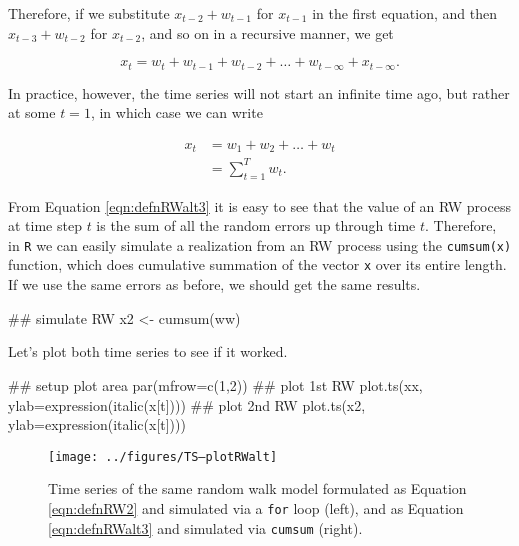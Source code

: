 \noindent Therefore, if we substitute $x_{t-2} + w_{t-1}$ for $x_{t-1}$ in the first equation, and then $x_{t-3} + w_{t-2}$ for $x_{t-2}$, and so on in a recursive manner, we get

\begin{equation}\label{eqn:defnRWalt2}
  x_t = w_t + w_{t-1} + w_{t-2} + \dots + w_{t-\infty} + x_{t-\infty}.
\end{equation}

\noindent In practice, however, the time series will not start an infinite time ago, but rather at some $t=1$, in which case we can write

\begin{equation}\label{eqn:defnRWalt3}
  \begin{aligned}
  x_t &= w_1 + w_2 + \dots + w_t \\
      &= \sum_{t=1}^{T} w_t.
  \end{aligned}
\end{equation}

From Equation \eqref{eqn:defnRWalt3} it is easy to see that the value of an RW process at time step $t$ is the sum of all the random errors up through time $t$.  Therefore, in \texttt{R} we can easily simulate a realization from an RW process using the \texttt{cumsum(x)} function, which does cumulative summation of the vector \texttt{x} over its entire length.  If we use the same errors as before, we should get the same results.

\begin{Schunk}
\begin{Sinput}
 ## simulate RW
 x2 <- cumsum(ww)
\end{Sinput}
\end{Schunk}

\noindent Let's plot both time series to see if it worked.

\begin{Schunk}
\begin{Sinput}
 ## setup plot area
 par(mfrow=c(1,2))
 ## plot 1st RW
 plot.ts(xx, ylab=expression(italic(x[t])))
 ## plot 2nd RW
 plot.ts(x2, ylab=expression(italic(x[t])))
\end{Sinput}
\end{Schunk}

\begin{figure}[htp]
\begin{center}
\texttt{[image: ../figures/TS--plotRWalt]}
\end{center}
\caption{Time series of the same random walk model formulated as Equation \eqref{eqn:defnRW2} and simulated via a \texttt{for} loop (left), and as Equation \eqref{eqn:defnRWalt3} and simulated via \texttt{cumsum} (right).}
\label{fig:LW1.figRWcomp}
\end{figure}


